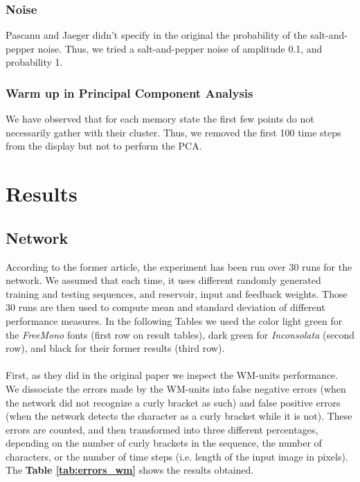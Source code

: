 \subsubsection{Noise}

Pascanu and Jaeger didn't specify in the original the probability of the salt-and-pepper noise. Thus, we tried a salt-and-pepper noise of amplitude 0.1, and probability 1. \\

\subsubsection{Warm up in Principal Component Analysis}

We have observed that for each memory state the first few points do not necessarily gather with their cluster. Thus, we removed the first 100 time steps from the display but not to perform the PCA.

\section{Results}
\label{s:result}

\subsection{Network}
According to the former article, the experiment has been run over 30 runs for the network. 
We assumed that each time, it uses different randomly generated training and testing sequences, and reservoir, input and feedback weights. Those 30 runs are then used to compute mean and standard deviation of different performance measures. In the following Tables we used the color light green for the \textit{FreeMono} fonts (first row on result tables), dark green for \textit{Inconsolata} (second row), and black for their former results (third row). \\
\\
First, as they did in the original paper we inspect the WM-units performance.
We dissociate the errors made by the WM-units into false negative errors (when the network did not recognize a curly bracket as such) and false positive errors (when the network detects the character as a curly bracket while it is not).
These errors are counted, and then transformed into three different percentages, depending on the number of curly brackets in the sequence, the number of characters, or the number of time steps (i.e. length of the input image in pixels). The \textbf{Table \ref{tab:errors_wm}} shows the results obtained. \\
\\

